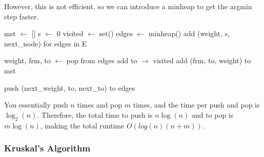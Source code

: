 \documentclass{article}
\begin{document}
      \begin{algo}
        However, this is not efficient, so we can introduce a minheap to get the argmin step faster. 
        \begin{algorithm}[H]
          \label{alg:prims}
          \begin{algorithmic}[1]
              \State mst $\gets$ [] 
              \State s $\gets$ 0 
              \State visited $\gets$ set() 
              \State edges $\gets$ minheap() 
              \State add (weight, s, next\_node) for edges in E 

               
                \State weight, frm, to $\gets$ pop from edges 
                 
                  \State add to $\rightarrow$ visited 
                  \State add (frm, to, weight) to mst 

                   
                     
                      \State push (next\_weight, to, next\_to) to edges
                    \EndIf
                  \EndFor
                \EndIf
              \EndWhile 

              \State {} 
            \EndFunction
          \end{algorithmic}
        \end{algorithm}

        You essentially push $n$ times and pop $m$ times, and the time per push and pop is $\log_2 (n)$. Therefore, the total time to push is $n \log(n)$ and to pop is $m \log (n)$, making the total runtime $O(log(n) (n+m))$. 
      \end{algo}

    \subsubsection{Kruskal's Algorithm}
\end{document}
